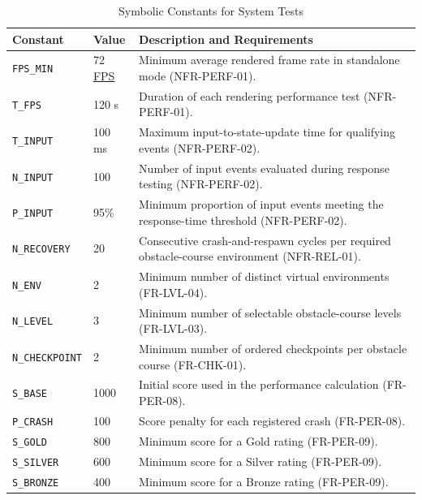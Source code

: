\documentclass[12pt, titlepage]{article}
\begin{document}
\begin{table}[H]
\centering
\caption{Symbolic Constants for System Tests}
\label{tab:vnv-system-parameters}
\small
\begin{tabularx}{\textwidth}{@{}l l X@{}}
\toprule
\textbf{Constant} & \textbf{Value} & \textbf{Description and Requirements} \\
\midrule

\texttt{FPS\_MIN} & 72 \hyperlink{abbr:FPS}{FPS} &
Minimum average rendered frame rate in standalone mode (NFR-PERF-01). \\

\texttt{T\_FPS} & 120 s &
Duration of each rendering performance test (NFR-PERF-01). \\

\texttt{T\_INPUT} & 100 ms &
Maximum input-to-state-update time for qualifying events (NFR-PERF-02). \\

\texttt{N\_INPUT} & 100 &
Number of input events evaluated during response testing (NFR-PERF-02). \\

\texttt{P\_INPUT} & 95\% &
Minimum proportion of input events meeting the response-time threshold (NFR-PERF-02). \\

\texttt{N\_RECOVERY} & 20 &
Consecutive crash-and-respawn cycles per required obstacle-course environment (NFR-REL-01). \\

\texttt{N\_ENV} & 2 &
Minimum number of distinct virtual environments (FR-LVL-04). \\

\texttt{N\_LEVEL} & 3 &
Minimum number of selectable obstacle-course levels (FR-LVL-03). \\

\texttt{N\_CHECKPOINT} & 2 &
Minimum number of ordered checkpoints per obstacle course (FR-CHK-01). \\

\texttt{S\_BASE} & 1000 &
Initial score used in the performance calculation (FR-PER-08). \\

\texttt{P\_CRASH} & 100 &
Score penalty for each registered crash (FR-PER-08). \\

\texttt{S\_GOLD} & 800 &
Minimum score for a Gold rating (FR-PER-09). \\

\texttt{S\_SILVER} & 600 &
Minimum score for a Silver rating (FR-PER-09). \\

\texttt{S\_BRONZE} & 400 &
Minimum score for a Bronze rating (FR-PER-09). \\

\bottomrule
\end{tabularx}
\end{table}
\end{document}
